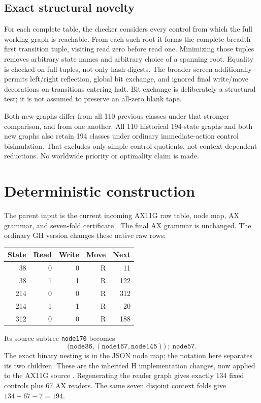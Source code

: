 \documentclass[10pt,letterpaper]{article}
\begin{document}
\subsection{Exact structural novelty}

For each complete table, the checker considers every control from which
the full working graph is reachable. From each such root it forms the
complete breadth-first transition tuple, visiting read zero before read
one. Minimizing those tuples removes arbitrary state names and arbitrary
choice of a spanning root. Equality is checked on full tuples, not only
hash digests. The broader screen additionally permits left/right
reflection, global bit exchange, and ignored final write/move decorations
on transitions entering halt. Bit exchange is deliberately a structural
test; it is not assumed to preserve an all-zero blank tape.

Both new graphs differ from all 110 previous classes under that stronger
comparison, and from one another. All 110 historical 194-state graphs and
both new graphs also retain 194 classes under ordinary immediate-action
control bisimulation. That excludes only simple control quotients, not
context-dependent reductions. No worldwide priority or optimality claim
is made.

\section{Deterministic construction}

The parent input is the current incoming AX11G raw table, node map, AX
grammar, and seven-fold certificate \cite{ax11g}. The final AX grammar is
unchanged. The ordinary GH version changes these native raw rows:
\begin{center}
\begin{tabular}{rrrrr}\toprule
State&Read&Write&Move&Next\\\midrule
38&0&0&R&11\\38&1&1&R&122\\
214&0&0&R&312\\214&1&1&R&20\\312&0&0&R&188\\\bottomrule
\end{tabular}
\end{center}
Its source subtree \texttt{node170} becomes
\[
 \bigl(\texttt{node36},(\texttt{node167},\texttt{node145})\bigr)
 \ ;\ \texttt{node57}.
\]
The exact binary nesting is in the JSON node map; the notation here
separates its two children. These are the inherited H implementation
changes, now applied to the AX11G source \cite{gh}. Regenerating the
reader graph gives exactly 134 fixed controls plus 67 AX readers.
The same seven disjoint context folds give $134+67-7=194$.
\end{document}

